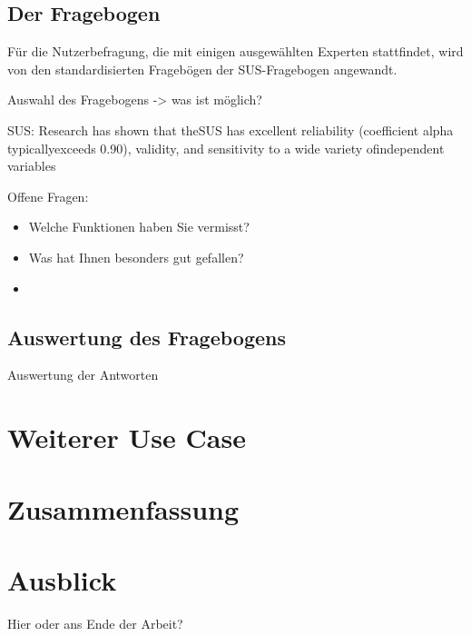 \subsection{Der Fragebogen}


Für die Nutzerbefragung, die mit einigen ausgewählten Experten stattfindet, wird von den standardisierten Fragebögen der SUS-Fragebogen angewandt. 

Auswahl des Fragebogens -> was ist möglich?

SUS: Research has shown that theSUS  has  excellent  reliability  (coefficient  alpha  typicallyexceeds 0.90), validity, and sensitivity to a wide variety ofindependent variables

Offene Fragen:
\begin{itemize}
\item Welche Funktionen haben Sie vermisst?
\item Was hat Ihnen besonders gut gefallen?
\item 
\end{itemize}

\subsection{Auswertung des Fragebogens}
Auswertung der Antworten

\section{Weiterer Use Case}

\section{Zusammenfassung}

\section{Ausblick}
Hier oder ans Ende der Arbeit?